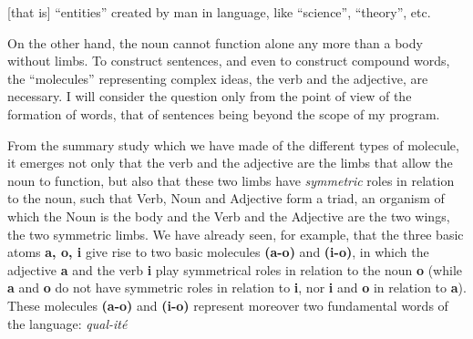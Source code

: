 \begin{sloppypar}
{}
% 
{\noindent
  {[that is]} ``entities'' created by man in language, like
  ``science'', ``theory'', etc.

  On the other hand, the noun cannot function alone any more than a
  body without limbs. To construct sentences, and even to construct
  compound words, the ``molecules'' representing complex ideas, the
  verb and the adjective, are necessary. I will consider the question
  only from the point of view of the formation of words, that of
  sentences being beyond the scope of my program.

  From the summary study which we have made of the different types of
  molecule, it emerges not only that the verb and the adjective are
  the limbs that allow the noun to function, but also that these two
  limbs have \emph{symmetric} roles in relation to the noun, such that
  Verb, Noun and Adjective form a triad, an organism of which the Noun
  is the body and the Verb and the Adjective are the two wings, the
  two symmetric limbs. We have already seen, for example, that the
  three basic atoms \textbf{a, o, i} give rise to two basic molecules
  \textbf{(a-o)} and \textbf{(i-o)}, in which the adjective \textbf{a}
  and the verb \textbf{i} play symmetrical roles in relation to the
  noun \textbf{o} (while \textbf{a} and \textbf{o} do not have
  symmetric roles in relation to \textbf{i}, nor \textbf{i} and
  \textbf{o} in relation to \textbf{a}). These molecules
  \textbf{(a-o)} and \textbf{(i-o)} represent moreover two fundamental
  words of the language: \emph{qual-ité}
  
}

\end{sloppypar}
